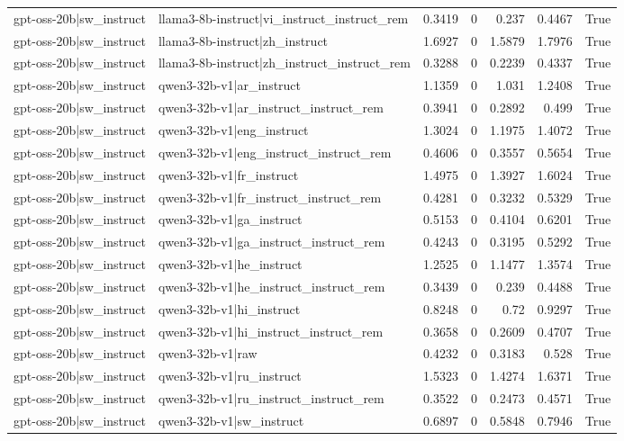 \begin{table}
\begin{tabular}{l l r r r r l}
gpt-oss-20b|sw_instruct & llama3-8b-instruct|vi_instruct_instruct_rem & 0.3419 & 0 & 0.237 & 0.4467 & True \\
gpt-oss-20b|sw_instruct & llama3-8b-instruct|zh_instruct & 1.6927 & 0 & 1.5879 & 1.7976 & True \\
gpt-oss-20b|sw_instruct & llama3-8b-instruct|zh_instruct_instruct_rem & 0.3288 & 0 & 0.2239 & 0.4337 & True \\
gpt-oss-20b|sw_instruct & qwen3-32b-v1|ar_instruct & 1.1359 & 0 & 1.031 & 1.2408 & True \\
gpt-oss-20b|sw_instruct & qwen3-32b-v1|ar_instruct_instruct_rem & 0.3941 & 0 & 0.2892 & 0.499 & True \\
gpt-oss-20b|sw_instruct & qwen3-32b-v1|eng_instruct & 1.3024 & 0 & 1.1975 & 1.4072 & True \\
gpt-oss-20b|sw_instruct & qwen3-32b-v1|eng_instruct_instruct_rem & 0.4606 & 0 & 0.3557 & 0.5654 & True \\
gpt-oss-20b|sw_instruct & qwen3-32b-v1|fr_instruct & 1.4975 & 0 & 1.3927 & 1.6024 & True \\
gpt-oss-20b|sw_instruct & qwen3-32b-v1|fr_instruct_instruct_rem & 0.4281 & 0 & 0.3232 & 0.5329 & True \\
gpt-oss-20b|sw_instruct & qwen3-32b-v1|ga_instruct & 0.5153 & 0 & 0.4104 & 0.6201 & True \\
gpt-oss-20b|sw_instruct & qwen3-32b-v1|ga_instruct_instruct_rem & 0.4243 & 0 & 0.3195 & 0.5292 & True \\
gpt-oss-20b|sw_instruct & qwen3-32b-v1|he_instruct & 1.2525 & 0 & 1.1477 & 1.3574 & True \\
gpt-oss-20b|sw_instruct & qwen3-32b-v1|he_instruct_instruct_rem & 0.3439 & 0 & 0.239 & 0.4488 & True \\
gpt-oss-20b|sw_instruct & qwen3-32b-v1|hi_instruct & 0.8248 & 0 & 0.72 & 0.9297 & True \\
gpt-oss-20b|sw_instruct & qwen3-32b-v1|hi_instruct_instruct_rem & 0.3658 & 0 & 0.2609 & 0.4707 & True \\
gpt-oss-20b|sw_instruct & qwen3-32b-v1|raw & 0.4232 & 0 & 0.3183 & 0.528 & True \\
gpt-oss-20b|sw_instruct & qwen3-32b-v1|ru_instruct & 1.5323 & 0 & 1.4274 & 1.6371 & True \\
gpt-oss-20b|sw_instruct & qwen3-32b-v1|ru_instruct_instruct_rem & 0.3522 & 0 & 0.2473 & 0.4571 & True \\
gpt-oss-20b|sw_instruct & qwen3-32b-v1|sw_instruct & 0.6897 & 0 & 0.5848 & 0.7946 & True \\

\end{tabular}
\end{table}
